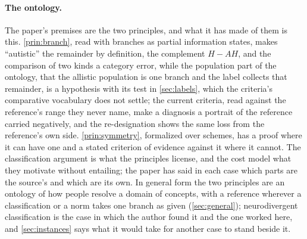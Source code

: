 \paragraph{The ontology.} The paper's premises are the two principles, and what it has made of them is this. \autoref{prin:branch}, read with branches as partial information states, makes ``autistic'' the remainder by definition, the complement $H - AH$, and the comparison of two kinds a category error, while the population part of the ontology, that the allistic population is one branch and the label collects that remainder, is a hypothesis with its test in \autoref{sec:labels}, which the criteria's comparative vocabulary does not settle; the current criteria, read against the reference's range they never name, make a diagnosis a portrait of the reference carried negatively, and the re-designation shows the same loss from the reference's own side. \autoref{prin:symmetry}, formalized over schemes, has a proof where it can have one and a stated criterion of evidence against it where it cannot. The classification argument is what the principles license, and the cost model what they motivate without entailing; the paper has said in each case which parts are the source's and which are its own. In general form the two principles are an ontology of how people resolve a domain of concepts, with a reference wherever a classification or a norm takes one branch as given (\autoref{sec:general}); neurodivergent classification is the case in which the author found it and the one worked here, and \autoref{sec:instances} says what it would take for another case to stand beside it.
